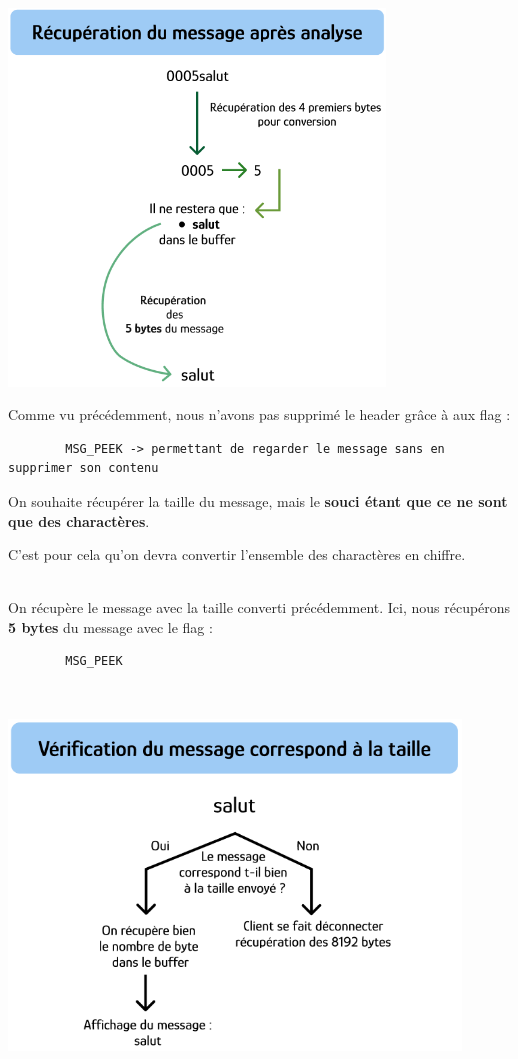     {
    \centering
    \includegraphics[width=10cm]{figures/recup_message_ana.png}
    \par
    } \hfill \par

    Comme vu précédemment, nous n'avons pas supprimé le header grâce à aux flag : \begin{lstlisting}
        MSG_PEEK -> permettant de regarder le message sans en supprimer son contenu
    \end{lstlisting}

    On souhaite récupérer la taille du message, mais le \textbf{souci étant que ce ne sont que des charactères}.\par C'est pour cela qu'on devra convertir l'ensemble des charactères en chiffre. \\ \\ \par

    On récupère le message avec la taille converti précédemment. Ici, nous récupérons \textbf{5 bytes} du message avec le flag :
    \begin{lstlisting}
        MSG_PEEK
    \end{lstlisting} \hfill \\

    {
    \centering
    \includegraphics[width=12cm]{figures/recup_message_entier.png}
    \par
    } \hfill \par


